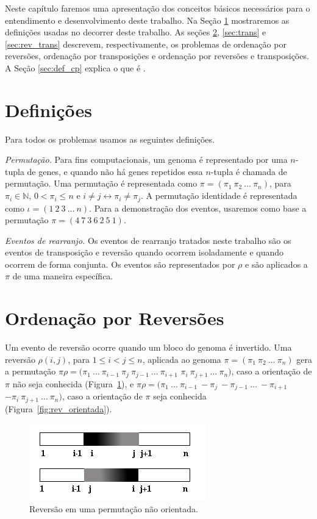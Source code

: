 Neste capítulo faremos uma apresentação dos conceitos básicos
necessários para o entendimento e desenvolvimento deste trabalho. Na
Seção \ref{sec:defin} mostraremos as definições usadas no decorrer
deste trabalho. As seções \ref{sec:rev}, \ref{sec:trans}
e \ref{sec:rev_trans} descrevem, respectivamente, os problemas de
ordenação por reversões, ordenação por transposições e ordenação por
reversões e transposições. A Seção \ref{sec:def_cp} explica o que
é \pr{}.

\section{Definições}
\label{sec:defin}
Para todos os problemas usamos as seguintes definições.

\textit{Permutação.} 
Para fins computacionais, um genoma é representado por uma $n$-tupla
de genes, e quando não há genes repetidos essa $n$-tupla é chamada de
permutação. Uma permutação é representada como $\pi =
(\pi_{1}~\pi_{2}~\ldots~\pi_{n})$, para $\pi_{i} \in \mathbb{N}$, $0
< \pi_{i} \leq n$ e $i \neq j \leftrightarrow \pi_{i} \neq \pi_{j}$. A
permutação identidade é representada como $\iota =
(1~2~3~\ldots~n)$. Para a demonstração dos eventos, usaremos como
base a permutação $\pi = (4~7~3~6~2~5~1)$.

\textit{Eventos de rearranjo.}
Os eventos de rearranjo tratados neste trabalho são os eventos de
transposição e reversão quando ocorrem isoladamente e quando ocorrem
de forma conjunta. Os eventos são representados por $\rho$ e são
aplicados a $\pi$ de uma maneira específica.

\section{Ordenação por Reversões}
\label{sec:rev}
Um evento de reversão ocorre quando um bloco do genoma é
invertido. Uma reversão $\rho(i, j)$, para $1 \leq i < j \leq n$,
aplicada ao genoma $\pi = (\pi_{1}~\pi_{2}~\ldots~\pi_{n})$ gera a
permutação $\pi\rho =
(\pi_{1}~\ldots~\pi_{i-1}~\pi_{j}~\pi_{j-1}~\ldots~\pi_{i+1}$
$\pi_{i}~ \pi_{j+1}~\ldots~\pi_{n})$, caso a orientação de $\pi$ não
seja conhecida (Figura~\ref{fig:rev_nao_orientada}), e $\pi\rho =
(\pi_{1}~\ldots~\pi_{i-1}~-\pi_{j}~-\pi_{j-1}~\ldots~-\pi_{i+1}$
$-\pi_{i}~ \pi_{j+1}~\ldots~\pi_{n})$, caso a orientação de $\pi$ seja
conhecida (Figura~\ref{fig:rev_orientada}).

\begin{figure}
  \centering
  \includegraphics{images/rev_nao_orientada.png} 
  \caption{Reversão em uma permutação não orientada.}
  \label{fig:rev_nao_orientada}
\end{figure}

